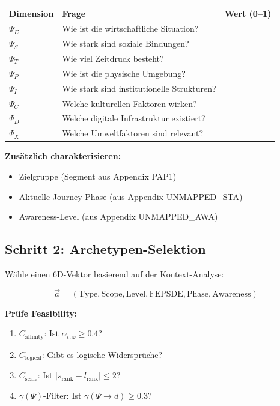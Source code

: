 \begin{center}
\begin{tabular}{@{}lll@{}}
\toprule
\textbf{Dimension} & \textbf{Frage} & \textbf{Wert (0--1)} \\
\midrule
$\Psi_E$ & Wie ist die wirtschaftliche Situation? & \\
$\Psi_S$ & Wie stark sind soziale Bindungen? & \\
$\Psi_T$ & Wie viel Zeitdruck besteht? & \\
$\Psi_P$ & Wie ist die physische Umgebung? & \\
$\Psi_I$ & Wie stark sind institutionelle Strukturen? & \\
$\Psi_C$ & Welche kulturellen Faktoren wirken? & \\
$\Psi_D$ & Welche digitale Infrastruktur existiert? & \\
$\Psi_X$ & Welche Umweltfaktoren sind relevant? & \\
\bottomrule
\end{tabular}
\end{center}

\textbf{Zusätzlich charakterisieren:}
\begin{itemize}[nosep]
\item Zielgruppe (Segment aus Appendix PAP1)
\item Aktuelle Journey-Phase (aus Appendix UNMAPPED_STA)
\item Awareness-Level (aus Appendix UNMAPPED_AWA)
\end{itemize}


\subsection{Schritt 2: Archetypen-Selektion}

Wähle einen 6D-Vektor basierend auf der Kontext-Analyse:

\begin{equation}
\vec{a} = (\text{Type}, \text{Scope}, \text{Level}, \text{FEPSDE}, \text{Phase}, \text{Awareness})
\end{equation}

\textbf{Prüfe Feasibility:}
\begin{enumerate}[nosep]
\item $C_{\text{affinity}}$: Ist $\alpha_{t,\varphi} \geq 0.4$?
\item $C_{\text{logical}}$: Gibt es logische Widersprüche?
\item $C_{\text{scale}}$: Ist $|s_{\text{rank}} - l_{\text{rank}}| \leq 2$?
\item $\gamma(\Psi)$-Filter: Ist $\gamma(\Psi \rightarrow d) \geq 0.3$?
\end{enumerate}

